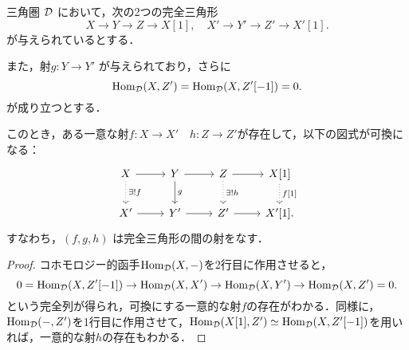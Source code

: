 \begin{prop}\cite[p.247]{KS06}
三角圏 ${\mathcal D}$ において，次の2つの完全三角形
\[
X \rightarrow Y \rightarrow Z \rightarrow X[1], \quad
X' \rightarrow Y' \rightarrow Z' \rightarrow X'[1].
\]
が与えられているとする．

また，射$g\colon Y\to Y'$ が与えられており，さらに
\[
\operatorname{\mathrm{Hom}}_{{\mathcal D}}(X, Z') = \operatorname{\mathrm{Hom}}_{{\mathcal D}}(X, Z'[-1]) = 0.
\]
が成り立つとする．

このとき，ある一意な射$f\colon X\to X'\quad h\colon Z\to Z'$が存在して，以下の図式が可換になる：
\[
\begin{tikzcd}
	X \arrow{r} \arrow[dotted]{d}{\exists !f} & Y \arrow{r} \arrow{d}{ g} & Z \arrow{r} \arrow[dotted]{d}{\exists !h} & X[1] \arrow[dotted]{d}{f[1]} \\
X' \arrow{r} & Y' \arrow{r} & Z' \arrow{r} & X'[1].
\end{tikzcd}
\]
すなわち，$(f,g,h)$ は完全三角形の間の射をなす．
\end{prop}
\begin{proof}
	コホモロジー的函手$\operatorname{\mathrm{Hom}}_{{\mathcal D}}(X,-)$を2行目に作用させると，
	\[0=\operatorname{\mathrm{Hom}}_{{\mathcal D}}(X,Z'[-1])\rightarrow \operatorname{\mathrm{Hom}}_{{\mathcal D}}(X,X') \rightarrow \operatorname{\mathrm{Hom}}_{{\mathcal D}}(X,Y') \rightarrow \operatorname{\mathrm{Hom}}_{{\mathcal D}}(X,Z')=0.\]
	という完全列が得られ，可換にする一意的な射$f$の存在がわかる．同様に，$\operatorname{\mathrm{Hom}}_{{\mathcal D}}(-,Z')$を1行目に作用させて，$\operatorname{\mathrm{Hom}}_{{\mathcal D}}(X[1],Z')\simeq \operatorname{\mathrm{Hom}}_{{\mathcal D}}(X,Z'[-1])$を用いれば，一意的な射$h$の存在もわかる．

\end{proof}

